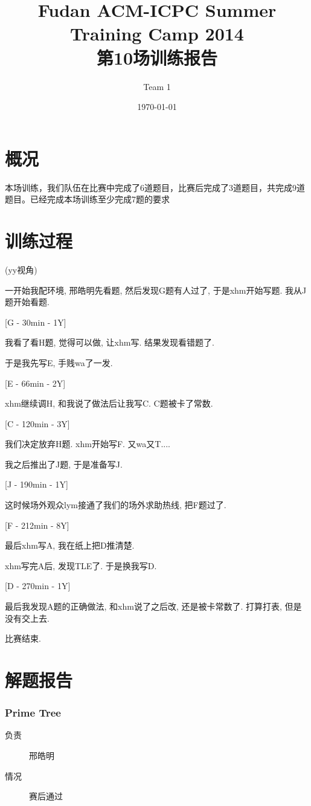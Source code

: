 \documentclass[a4paper, 11pt, nofonts, nocap, fancyhdr]{ctexart}
\title{Fudan ACM-ICPC Summer Training Camp 2014\\第10场训练报告}
\author{Team 1}
\date{\today}
\newcommand{\problem}[1]{\subsubsection{#1}}
\begin{document}
\maketitle

\section{概况}

本场训练，我们队伍在比赛中完成了6道题目，比赛后完成了3道题目，共完成9道题目。已经完成本场训练至少完成7题的要求

\section{训练过程}

(yy视角)

一开始我配环境, 邢皓明先看题, 然后发现G题有人过了, 于是xhm开始写题. 我从J题开始看题.

[G - 30min - 1Y]

我看了看H题, 觉得可以做, 让xhm写. 结果发现看错题了.

于是我先写E, 手贱wa了一发.

[E - 66min - 2Y]

xhm继续调H, 和我说了做法后让我写C. C题被卡了常数. 

[C - 120min - 3Y]

我们决定放弃H题. xhm开始写F. 又wa又T....

我之后推出了J题, 于是准备写J. 

[J - 190min - 1Y]

这时候场外观众lym接通了我们的场外求助热线, 把F题过了. 

[F - 212min - 8Y]

最后xhm写A, 我在纸上把D推清楚.

xhm写完A后, 发现TLE了. 于是换我写D. 

[D - 270min - 1Y]

最后我发现A题的正确做法, 和xhm说了之后改, 还是被卡常数了. 打算打表, 但是没有交上去.

比赛结束.

\section{解题报告}

\problem{Prime Tree}

\begin{description}
\item[负责] 邢皓明
\item[情况] 赛后通过
\end{description}
\end{document}
